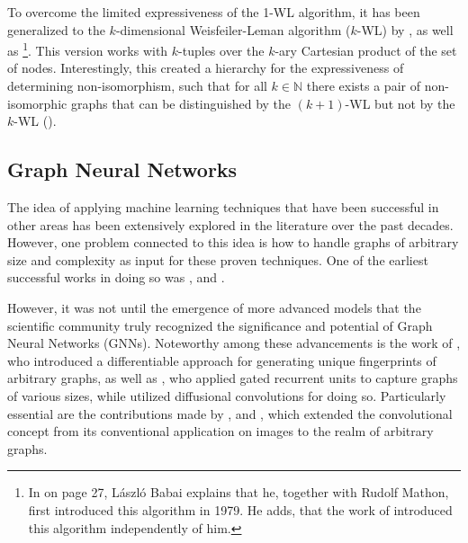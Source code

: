 To overcome the limited expressiveness of the 1-WL algorithm, it has been generalized to the $k$-dimensional Weisfeiler-Leman algorithm ($k$-WL) by \cite{Bab1979, Babai2016}, as well as \cite{Imm+1990}\footnote{In \cite{Babai2016} on page 27, László Babai explains that he, together with Rudolf Mathon, first introduced this algorithm in 1979. He adds, that the work of \cite{Imm+1990} introduced this algorithm independently of him.}. This version works with $k$-tuples over the $k$-ary Cartesian product of the set of nodes. Interestingly, this created a hierarchy for the expressiveness of determining non-isomorphism, such that for all $k \in \mathbb{N}$ there exists a pair of non-isomorphic graphs that can be distinguished by the $(k+1)$-WL but not by the $k$-WL (\cite{Cai1992}).

\subsection{Graph Neural Networks}
The idea of applying machine learning techniques that have been successful in other areas has been extensively explored in the literature over the past decades. However, one problem connected to this idea is how to handle graphs of arbitrary size and complexity as input for these proven techniques. One of the earliest successful works in doing so was \cite{Sperduti1997,Scarselli2008}, and \cite{Micheli2009}.

However, it was not until the emergence of more advanced models that the scientific community truly recognized the significance and potential of Graph Neural Networks (GNNs). Noteworthy among these advancements is the work of \cite{Duvenaud2015}, who introduced a differentiable approach for generating unique fingerprints of arbitrary graphs, as well as \cite{Li2015}, who applied gated recurrent units to capture graphs of various sizes, while \cite{Atwood2016} utilized diffusional convolutions for doing so. Particularly essential are the contributions made by \cite{Bruna2013,Defferrard2016}, and \cite{Kip+2017}, which extended the convolutional concept from its conventional application on images to the realm of arbitrary graphs.

